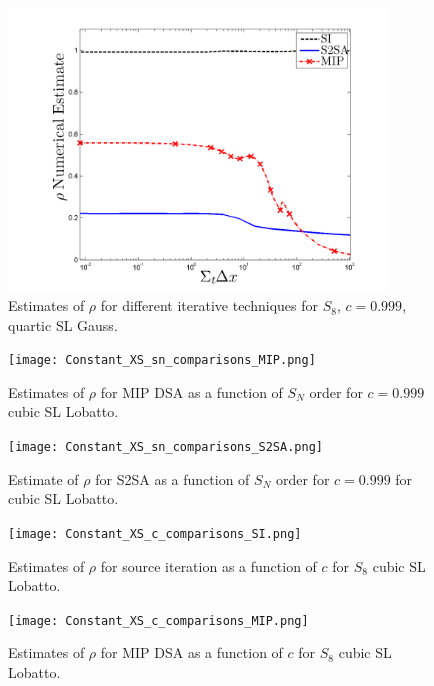 \begin{figure}[!hbp]
\centering
\includegraphics[width=10cm]{Constant_XS_SN8_P4_Gauss_Solvers.png}
\caption{Estimates of $\rho$ for different iterative techniques for $S_8$, $c=0.999$, quartic SL Gauss.}
\label{fig:p4_solvers}
\end{figure}

\begin{figure}[!htp]
\centering
\texttt{[image: Constant\_XS\_sn\_comparisons\_MIP.png]}
\caption{Estimates of $\rho$ for MIP DSA as a function of  $S_N$ order for $c=0.999$ cubic SL Lobatto.}
\label{fig:mip_as_fun_sn}
\end{figure}

\begin{figure}[!hbp]
\centering
\texttt{[image: Constant\_XS\_sn\_comparisons\_S2SA.png]}
\caption{Estimate of $\rho$ for S2SA as a function of $S_N$ order for $c=0.999$ for  cubic SL Lobatto.}
\label{fig:s2sa_as_fun_sn}
\end{figure}

\begin{figure}[!htp]
\centering
\texttt{[image: Constant\_XS\_c\_comparisons\_SI.png]}
\caption{Estimates of $\rho$ for source iteration as a function of $c$ for  $S_8$ cubic SL Lobatto.}
\label{fig:si_as_fun_c}
\end{figure}

\begin{figure}[!hbp]
\centering
\texttt{[image: Constant\_XS\_c\_comparisons\_MIP.png]}
\caption{Estimates of $\rho$ for MIP DSA as a function of $c$  for  $S_8$  cubic SL Lobatto.}
\label{fig:mip_as_fun_c}
\end{figure}

